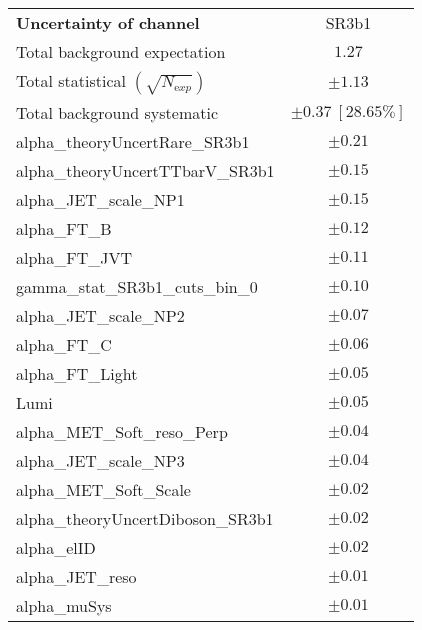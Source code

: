
\begin{table}
\begin{center}
\setlength{\tabcolsep}{0.0pc}
\begin{tabular*}{\textwidth}{@{\extracolsep{\fill}}lc}
\noalign{\smallskip}\hline\noalign{\smallskip}
{\bfseries Uncertainty of channel}                                    & SR3b1            \\
\noalign{\smallskip}\hline\noalign{\smallskip}
Total background expectation             &  $1.27$       \\
\noalign{\smallskip}\hline\noalign{\smallskip}
Total statistical $(\sqrt{N_{\mathrm exp}})$              & $\pm 1.13$       \\
Total background systematic               & $\pm 0.37\ [28.65\%] $             \\
\noalign{\smallskip}\hline\noalign{\smallskip}
\noalign{\smallskip}\hline\noalign{\smallskip}
alpha\_theoryUncertRare\_SR3b1         & $\pm 0.21$       \\
alpha\_theoryUncertTTbarV\_SR3b1         & $\pm 0.15$       \\
alpha\_JET\_scale\_NP1         & $\pm 0.15$       \\
alpha\_FT\_B         & $\pm 0.12$       \\
alpha\_FT\_JVT         & $\pm 0.11$       \\
gamma\_stat\_SR3b1\_cuts\_bin\_0         & $\pm 0.10$       \\
alpha\_JET\_scale\_NP2         & $\pm 0.07$       \\
alpha\_FT\_C         & $\pm 0.06$       \\
alpha\_FT\_Light         & $\pm 0.05$       \\
Lumi         & $\pm 0.05$       \\
alpha\_MET\_Soft\_reso\_Perp         & $\pm 0.04$       \\
alpha\_JET\_scale\_NP3         & $\pm 0.04$       \\
alpha\_MET\_Soft\_Scale         & $\pm 0.02$       \\
alpha\_theoryUncertDiboson\_SR3b1         & $\pm 0.02$       \\
alpha\_elID         & $\pm 0.02$       \\
alpha\_JET\_reso         & $\pm 0.01$       \\
alpha\_muSys         & $\pm 0.01$       \\

\end{tabular*}
\end{center}
\end{table}

